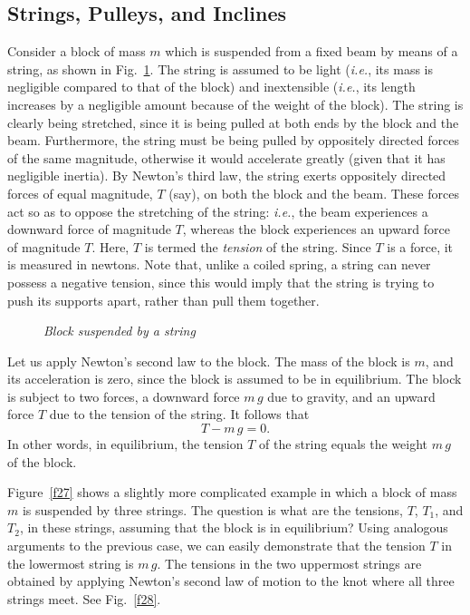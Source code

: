 \subsection{Strings, Pulleys, and Inclines}\label{sspi}
Consider a block of mass $m$ which is suspended from a fixed beam by means
of a string, as shown in Fig.~\ref{f26}. The string is assumed to be
light ({\em i.e.}, its mass is negligible compared to that of the block) and
inextensible ({\em i.e.}, its length increases by a negligible amount because of the
weight of the block). The string is clearly being stretched, since it is being pulled at
both ends by the block and the beam. Furthermore, the string must be being pulled
by oppositely directed forces of the same magnitude, otherwise it would 
accelerate greatly (given that it has negligible inertia).
By Newton's third law, the string
exerts  oppositely directed
forces of equal magnitude, $T$ (say),  on both the block and the beam.
These forces act so as to 
oppose the stretching of the string:
{\em i.e.}, the beam experiences a downward force of magnitude $T$, whereas the
block experiences an upward force of magnitude $T$. Here, $T$ is termed the
{\em tension} of the string. Since $T$ is a force, it is measured in newtons. 
Note that, unlike a coiled spring, a string can never possess a negative tension, since
this would imply that the string is trying to push its supports apart, rather
than pull them together.

\begin{figure}
\epsfysize=2in
\centerline{}
\caption{\em Block suspended by a string}\label{f26}   
\end{figure}

Let us apply Newton's second law to the block. The mass of the block is $m$, and
its acceleration is zero, since the block is assumed to be in equilibrium.
The block is subject to two forces, a downward force $m\,g$ due to gravity, and
an upward force $T$ due to the tension of the string. It follows that
\begin{equation}
T - m\,g = 0.
\end{equation}
In other words, in equilibrium, the tension $T$ of the string equals the weight
$m\,g$ of the block.

Figure~\ref{f27} shows a slightly more complicated example in which a block of mass $m$ is
suspended by three strings. The question is what are the tensions, $T$, $T_1$, and $T_2$, in these
strings, assuming that the block is in equilibrium? Using analogous arguments to
the previous case, we can easily  demonstrate that the tension $T$ in the lowermost string is
$m\,g$. The tensions in the two uppermost strings are obtained by applying Newton's
second law of motion to the knot where all three strings meet. See Fig.~\ref{f28}.

